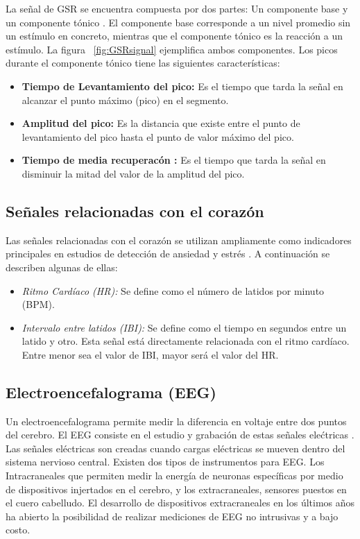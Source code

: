 	La se\~nal de GSR se encuentra compuesta por dos partes: Un componente base y un componente t\'onico \citep{Katsis2011261}. El componente base corresponde a un nivel promedio sin un est\'imulo en concreto, mientras que el componente t\'onico es la reacci\'on a un est\'imulo. La figura ~\ref{fig:GSRsignal} ejemplifica ambos componentes. Los picos durante el componente t\'onico tiene las siguientes caracter\'isticas:

\begin{itemize}
        \item{\textbf{Tiempo de Levantamiento del pico:}} Es el tiempo que tarda la se\~nal en alcanzar el punto m\'aximo (pico) en el segmento.
        \item{\textbf{Amplitud del pico:}} Es la distancia que existe entre el punto de levantamiento del pico hasta el punto de valor m\'aximo del pico.
        \item{\textbf{Tiempo de media recuperac\'on :}} Es el tiempo que tarda la se\~nal en disminuir la mitad del valor de la amplitud del pico.
\end{itemize}


	\subsection{Se\~nales relacionadas con el coraz\'on}\label{secc:hearthrate}
	Las se\~nales relacionadas con el coraz\'on se utilizan ampliamente como indicadores principales en estudios de detecci\'on de ansiedad y estr\'es \citep{Sharma20121287}. A continuaci\'on se describen algunas de ellas:
	\begin{itemize}
		\item \textit{Ritmo Card\'iaco (HR):} Se define como el n\'umero de latidos por minuto (BPM).
		\item \textit{Intervalo entre latidos (IBI):} Se define como el tiempo en segundos entre un latido y otro. Esta se\~nal est\'a directamente relacionada con el ritmo card\'iaco. Entre menor sea el valor de IBI, mayor ser\'a el valor del HR.
	\end{itemize}
	\subsection{Electroencefalograma (EEG)}\label{secc:eeg}
	Un electroencefalograma permite medir la diferencia en voltaje entre dos puntos del cerebro. El EEG consiste en el estudio y grabaci\'on de estas se\~nales ele\'ctricas \citep{tatum2014handbook}. Las se\~nales el\'ectricas son creadas cuando cargas el\'ectricas se mueven dentro del sistema nervioso central. Existen dos tipos de instrumentos para EEG. Los Intracraneales que permiten medir la energ\'ia de neuronas espec\'ificas por medio de dispositivos injertados en el cerebro, y los extracraneales, sensores puestos en el cuero cabelludo. El desarrollo de dispositivos extracraneales en los \'ultimos a\~nos ha abierto la posibilidad de realizar mediciones de EEG no intrusivas y a bajo costo.
